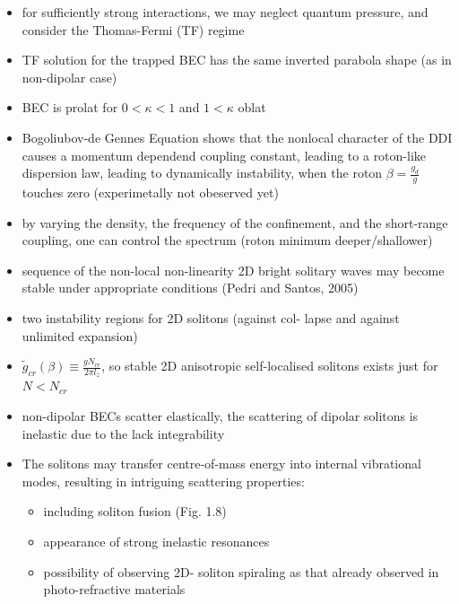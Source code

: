 \begin{itemize}
        \item for sufficiently strong interactions, we may neglect quantum pressure, and consider the Thomas-Fermi (TF) regime
        \item TF solution for the trapped BEC has the same inverted parabola shape (as in non-dipolar case)
        \item BEC is prolat for $0 < \kappa < 1$ and $1 < \kappa$ oblat
        \item Bogoliubov-de Gennes Equation shows that the nonlocal character of the DDI causes a momentum dependend coupling constant, leading to a roton-like dispersion law, leading to dynamically instability, when the roton $\beta = \frac{g_{d}}{g}$ touches zero (experimetally not obeserved yet)
        \item by varying the density, the frequency of the confinement, and the short-range coupling,
        one can control the spectrum (roton minimum deeper/shallower)
        \item sequence of the non-local non-linearity 2D bright solitary waves may become stable
under appropriate conditions (Pedri and Santos, 2005)
        \item two instability regions for 2D solitons (against col-
        lapse and against unlimited expansion)
  \item $\tilde{g}_{cr}(\beta) \equiv \frac{g N_{cr}}{2 \pi l_{z}}$, so stable 2D anisotropic self-localised solitons exists just for $N < N_{cr}$
        \item non-dipolar BECs scatter elastically, the scattering of dipolar solitons is inelastic due to the lack integrability
        \item The solitons may transfer centre-of-mass energy into internal vibrational modes,
        resulting in intriguing scattering properties:

        \begin{itemize}
          \item including soliton fusion (Fig. 1.8)
          \item appearance of strong inelastic resonances
          \item possibility of observing 2D- soliton spiraling as that already observed in photo-refractive materials
        \end{itemize}


\end{itemize}
